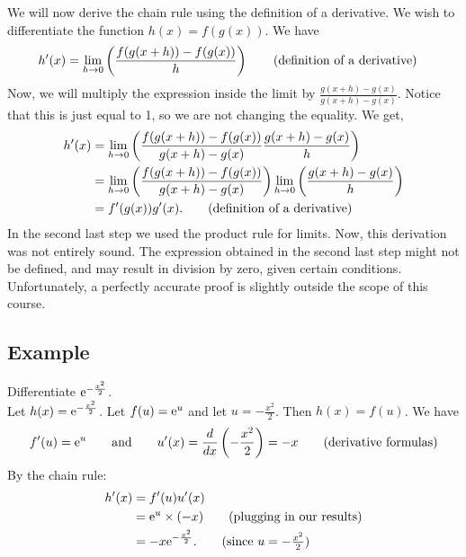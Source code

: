 \noindent We will now derive the chain rule using the definition of a derivative. We wish to differentiate the function $h(x) = f(g(x))$. We have
\begin{align*}
h'(x)& = \lim_{h \rightarrow 0}\left(\frac{f(g(x+h)) - f(g(x))}{h}\right) \tag{definition of a derivative}
\end{align*}
Now, we will multiply the expression inside the limit by $\frac{g(x+h) - g(x)}{g(x+h) - g(x)}$. Notice that this is just equal to 1, so we are not changing the equality. We get,
\begin{align*}
h'(x) & = \lim_{h \rightarrow 0}\left(\frac{f(g(x+h)) - f(g(x))}{g(x+h) - g(x)}\frac{g(x+h) - g(x)}{h}\right)  \\
	& =  \lim_{h \rightarrow 0}\left(\frac{f(g(x+h)) - f(g(x))}{g(x+h) - g(x)}\right)\lim_{h \rightarrow 0}\left(\frac{g(x+h) - g(x)}{h}\right) \\
	& = f'(g(x))g'(x). \tag{definition of a derivative}
\end{align*}
In the second last step we used the product rule for limits. Now, this derivation was not entirely sound. The expression obtained in the second last step might not be defined, and may result in division by zero, given certain conditions. Unfortunately, a perfectly accurate proof is slightly outside the scope of this course. \\ 


\subsection{Example}
Differentiate $\mathrm{e}^{-\frac{x^2}{2}}$.  \\

\solution
Let $h(x) = \mathrm{e}^{-\frac{x^2}{2}}$. Let $f(u) = \mathrm{e}^u$ and let $u = -\frac{x^2}{2}$. Then $h(x) = f(u)$. We have
\[
f'(u) = \mathrm{e}^u \qquad \text{and} \qquad u'(x) = \frac{d}{dx}\left(-\frac{x^2}{2}\right) = -x \tag{derivative formulas}
\]
By the chain rule:
\begin{align*}
h'(x) & = f'(u)u'(x) \\
	& = \e^u\times(-x) \tag{plugging in our results} \\
	& = -x\e^{-\frac{x^2}{2}}. \tag{since $u = -\frac{x^2}{2}$}
\end{align*}

